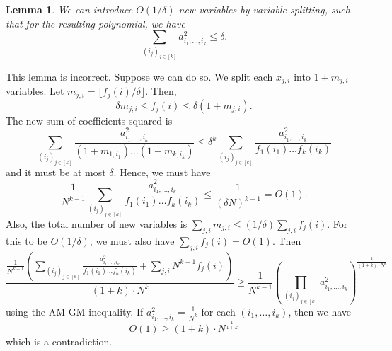\documentclass[12pt]{report}
\newtheorem{lemma}{Lemma}
\begin{document}
\begin{lemma}
We can introduce $O(1/\delta)$ new variables by variable splitting, such that for the resulting polynomial, we have
$$
\sum_{(i_j)_{j \in [k]}} a_{i_1, \ldots, i_k}^2 \leq \delta.
$$
\end{lemma}
This lemma is incorrect. Suppose we can do so. We split each $x_{j,i}$ into $1 + m_{j,i}$ variables. Let $m_{j,i} = \lfloor f_j(i)/\delta \rfloor$. Then,
$$
\delta m_{j,i} \leq f_j(i) \leq \delta (1 + m_{j,i}).
$$
The new sum of coefficients squared is
$$
\sum_{(i_j)_{j \in [k]}} \frac{a_{i_1, \ldots, i_k}^2}{(1 + m_{1,i_1}) \ldots (1 + m_{k,i_k})} \leq \delta^k \sum_{(i_j)_{j \in [k]}} \frac{a_{i_1, \ldots, i_k}^2}{f_1(i_1) \ldots f_k(i_k)}
$$
and it must be at most $\delta$. Hence, we must have
$$
\frac{1}{N^{k-1}} \sum_{(i_j)_{j \in [k]}} \frac{a_{i_1, \ldots, i_k}^2}{f_1(i_1) \ldots f_k(i_k)} \leq \frac{1}{(\delta N)^{k-1}} = O(1).
$$
Also, the total number of new variables is $\sum_{j, i} m_{j,i} \leq (1/\delta) \sum_{j, i} f_j(i)$. For this to be $O(1/\delta)$, we must also have $\sum_{j, i} f_j(i) = O(1)$. Then
\begin{equation*}
\frac{\frac{1}{N^{k-1}} \left(\sum_{(i_j)_{j \in [k]}} \frac{a_{i_1, \ldots, i_k}^2}{f_1(i_1) \ldots f_k(i_k)} + \sum_{j, i} N^{k-1} f_j(i)\right)}{(1+k)\cdot N^k} \geq \frac{1}{N^{k-1}} \left(\prod_{(i_j)_{j \in [k]}} a_{i_1, \ldots, i_k}^2\right)^\frac{1}{(1+k) \cdot N^k}
\end{equation*}
using the AM-GM inequality. If $a_{i_1, \ldots, i_k}^2 = \frac{1}{N^k}$ for each $(i_1, \ldots, i_k)$, then we have
$$
O(1) \geq (1+k)\cdot N^\frac{1}{1+k}
$$ which is a contradiction.



\end{document}
